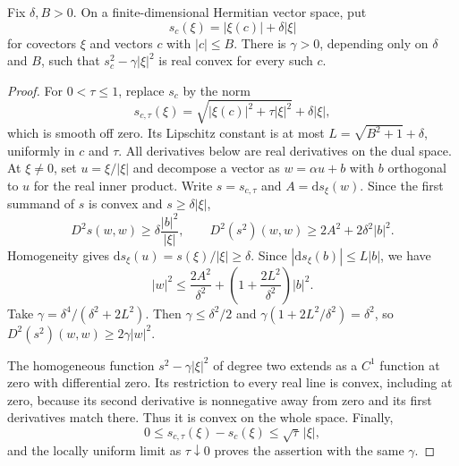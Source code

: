 \begin{lemma}\label{lem:ball-support-uniform-convexity}
Fix $\delta,B>0$. On a finite-dimensional Hermitian vector space, put
\[
 s_c(\xi)=|\xi(c)|+\delta|\xi|
\]
for covectors $\xi$ and vectors $c$ with $|c|\leq B$. There is $\gamma>0$, depending only on $\delta$ and $B$, such that $s_c^2-\gamma|\xi|^2$ is real convex for every such $c$.
\end{lemma}
\begin{proof}
For $0<\tau\leq1$, replace $s_c$ by the norm
\[
 s_{c,\tau}(\xi)=\sqrt{|\xi(c)|^2+\tau|\xi|^2}+\delta|\xi|,
\]
which is smooth off zero. Its Lipschitz constant is at most $L=\sqrt{B^2+1}+\delta$, uniformly in $c$ and $\tau$. All derivatives below are real derivatives on the dual space. At $\xi\ne0$, set $u=\xi/|\xi|$ and decompose a vector as $w=\alpha u+b$ with $b$ orthogonal to $u$ for the real inner product. Write $s=s_{c,\tau}$ and $A=\mathrm ds_\xi(w)$. Since the first summand of $s$ is convex and $s\geq\delta|\xi|$,
\[
 D^2s(w,w)\geq\delta\frac{|b|^2}{|\xi|},\qquad
 D^2(s^2)(w,w)\geq2A^2+2\delta^2|b|^2.
\]
Homogeneity gives $\mathrm ds_\xi(u)=s(\xi)/|\xi|\geq\delta$. Since $|\mathrm ds_\xi(b)|\leq L|b|$, we have
\[
 |w|^2\leq\frac{2A^2}{\delta^2}
       +\left(1+\frac{2L^2}{\delta^2}\right)|b|^2.
\]
Take $\gamma=\delta^4/(\delta^2+2L^2)$. Then $\gamma\leq\delta^2/2$ and $\gamma(1+2L^2/\delta^2)=\delta^2$, so $D^2(s^2)(w,w)\geq2\gamma|w|^2$.

The homogeneous function $s^2-\gamma|\xi|^2$ of degree two extends as a $C^1$ function at zero with differential zero. Its restriction to every real line is convex, including at zero, because its second derivative is nonnegative away from zero and its first derivatives match there. Thus it is convex on the whole space. Finally,
\[
 0\leq s_{c,\tau}(\xi)-s_c(\xi)\leq\sqrt\tau\,|\xi|,
\]
and the locally uniform limit as $\tau\downarrow0$ proves the assertion with the same $\gamma$.
\end{proof}


